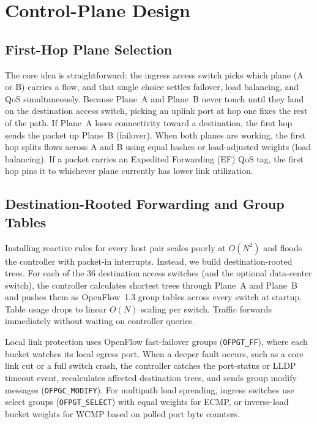\documentclass[conference]{IEEEtran}
\begin{document}
\section{Control-Plane Design}\label{sec:control}
\subsection{First-Hop Plane Selection}
The core idea is straightforward: the ingress access switch picks which plane (A or B) carries a flow, and that single choice settles failover, load balancing, and QoS simultaneously. Because Plane~A and Plane~B never touch until they land on the destination access switch, picking an uplink port at hop one fixes the rest of the path. If Plane~A loses connectivity toward a destination, the first hop sends the packet up Plane~B (failover). When both planes are working, the first hop splits flows across A and B using equal hashes or load-adjusted weights (load balancing). If a packet carries an Expedited Forwarding (EF) QoS tag, the first hop pins it to whichever plane currently has lower link utilization.

\subsection{Destination-Rooted Forwarding and Group Tables}
Installing reactive rules for every host pair scales poorly at $O(N^2)$ and floods the controller with packet-in interrupts. Instead, we build destination-rooted trees. For each of the 36 destination access switches (and the optional data-center switch), the controller calculates shortest trees through Plane~A and Plane~B and pushes them as OpenFlow~1.3 group tables across every switch at startup. Table usage drops to linear $O(N)$ scaling per switch. Traffic forwards immediately without waiting on controller queries.

Local link protection uses OpenFlow fast-failover groups (\texttt{OFPGT\_FF}), where each bucket watches its local egress port. When a deeper fault occurs, such as a core link cut or a full switch crash, the controller catches the port-status or LLDP timeout event, recalculates affected destination trees, and sends group modify messages (\texttt{OFPGC\_MODIFY}). For multipath load spreading, ingress switches use select groups (\texttt{OFPGT\_SELECT}) with equal weights for ECMP, or inverse-load bucket weights for WCMP based on polled port byte counters.
\end{document}
